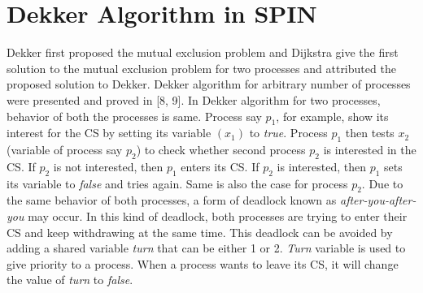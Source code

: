 \documentclass[conference]{IEEEtran}
\begin{document}
\section{Dekker Algorithm in SPIN}
Dekker first proposed the mutual exclusion problem and Dijkstra \cite{8} give the first solution to the mutual exclusion problem for two processes 
and attributed the proposed solution to Dekker. Dekker algorithm for arbitrary number of processes were presented and proved in [8, 9]. 
In Dekker algorithm for two processes, behavior of both the processes is same. Process say $p_1$, for example, show its interest for the CS
by setting its variable $(x_1)$ to \emph{true}. Process $p_1$ then tests $x_2$ (variable of process say $p_2$) to check whether second 
process $p_2$ is interested in the CS. If $p_2$ is not interested, then $p_1$ enters its CS. If $p_2$ is interested, 
then $p_1$ sets its variable to \emph{false} and tries again. Same is also the case for process $p_2$. Due to the same behavior of both processes, 
a form of deadlock known as \emph{after-you-after-you} may occur. In this kind of deadlock, both processes are trying to enter 
their CS and keep withdrawing at the same time. This deadlock can be avoided by adding a shared variable \emph{turn} that can be 
either 1 or 2. \emph{Turn} variable is used to give priority to a process. When a process wants to leave its CS, it will change 
the value of \emph{turn} to \emph{false}. 
\end{document}
